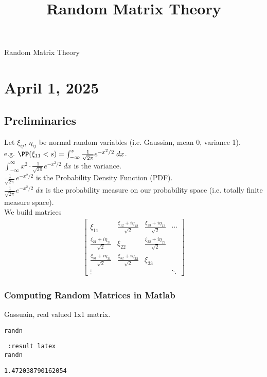 \documentclass[11pt]{article}
\date{}
\title{Random Matrix Theory}
\begin{document}
{\centering
{\LARGE Random Matrix Theory \par }}
\section*{April 1, 2025}
\label{sec:org753f1b8}
\subsection*{Preliminaries}
\label{sec:org5c08c5c}
Let \(\xi_{ij}\), \(\eta_{ij}\) be normal random variables (i.e. Gaussian, mean 0, variance 1).\\
e.g. \(\PP(\xi_{11}<s)=\int_{-\infty}^{s}\frac{1}{\sqrt{2\pi}}e^{-x^{2}/2}\;dx\).\\
\(\int_{-\infty}^{\infty}x^{2}\cdot\frac{1}{\sqrt{2\pi}}e^{-x^{2}/2}\;dx\) is the variance.\\
\(\frac{1}{\sqrt{2\pi}}e^{-x^{2}/2}\) is the Probability Density Function (PDF).\\
\(\frac{1}{\sqrt{2\pi}}e^{-x^{2}/2}\;dx\) is the probability measure on our probability space (i.e. totally finite measure space).\\
We build matrices\\
\begin{align*}
  \begin{bmatrix}
    \xi_{11} & \frac{\xi_{12}+i\eta_{12}}{\sqrt{2}} & \frac{\xi_{13}+i\eta_{13}}{\sqrt{2}} & \cdots \\
    \frac{\xi_{21}+i\eta_{21}}{\sqrt{2}} & \xi_{22} & \frac{\xi_{22}+i\eta_{22}}{\sqrt{2}} \\
    \frac{\xi_{31}+i\eta_{31}}{\sqrt{2}} & \frac{\xi_{32}+i\eta_{32}}{\sqrt{2}} &  \xi_{33} \\
    \vdots & & & \ddots
  \end{bmatrix}
\end{align*}
\subsubsection*{Computing Random Matrices in Matlab}
\label{sec:org67f1914}
Gassuain, real valued 1x1 matrix.\\
\begin{verbatim}
randn
\end{verbatim}
\begin{verbatim} :result latex
randn
\end{verbatim}

\label{}
\begin{verbatim}
1.472038790162054
\end{verbatim}
\end{document}
